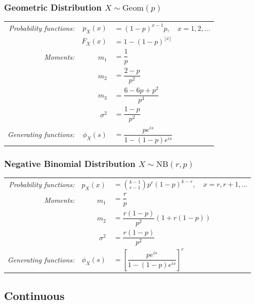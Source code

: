 \documentclass[11pt,a4paper]{article}
\theoremstyle{definition}
\begin{document}
\subsubsection*{Geometric Distribution $X \sim \text{Geom}(p)$}
{\renewcommand{\arraystretch}{1.6}
\begin{longtable}{r r l}
\textit{Probability functions:} & $p_X(x)$ & $=(1-p)^{x-1}p, \quad x=1,2,\dots$\\
& $F_X(x)$ & $=1-(1-p)^{\lfloor x\rfloor}$\\
\textit{Moments:} & $m_1$ & $=\dfrac{1}{p}$\\
& $m_2$ & $=\dfrac{2-p}{p^2}$\\
& $m_3$ & $=\dfrac{6-6p+p^2}{p^3}$\\
& $\sigma^2$ & $=\dfrac{1-p}{p^2}$\\
\textit{Generating functions:} 
& $\phi_X(s)$ & $=\dfrac{pe^{is}}{1-(1-p)e^{is}}$\\
\end{longtable}
}

\subsubsection*{Negative Binomial Distribution $X \sim \text{NB}(r, p)$}
{\renewcommand{\arraystretch}{1.8}
\begin{longtable}{r r l}
\textit{Probability functions:} & $p_X(x)$ & $\displaystyle= \binom{k-1}{r-1}p^r(1-p)^{k-r}, \quad x=r,r+1,\dots$\\
\textit{Moments:} & $m_1$ & $=\dfrac{r}{p}$\\
& $m_2$ & $=\dfrac{r(1-p)}{p^2}(1+r(1-p))$\\
& $\sigma^2$ & $=\dfrac{r(1-p)}{p^2}$\\
\textit{Generating functions:} 
& $\phi_X(s)$ & $=\left[\dfrac{pe^{is}}{1-(1-p)e^{is}}\right]^r$\\
\end{longtable}
}

\subsection{Continuous}

\end{document}
